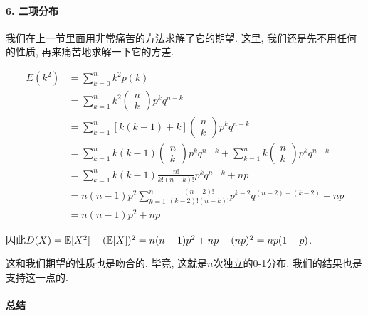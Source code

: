 \paragraph{6. 二项分布} 
我们在上一节里面用非常痛苦的方法求解了它的期望. 这里, 我们还是先不用任何的性质, 再来痛苦地求解一下它的方差. 

$$\begin{aligned} E\left(k^2\right) & =\sum_{k=0}^n k^2 p(k) \\ & =\sum_{k=1}^n k^2\left(\begin{array}{l}n \\ k\end{array}\right) p^k q^{n-k} \\ & =\sum_{k=1}^n[{k}({k}-1)+{k}]\left(\begin{array}{l}n \\ k\end{array}\right) p^k q^{n-k} \\ & =\sum_{k=1}^n k(k-1)\left(\begin{array}{l}n \\ k\end{array}\right) p^k q^{n-k}+\sum_{k=1}^n k\left(\begin{array}{l}n \\ k\end{array}\right) p^k q^{n-k} \\ & =\sum_{k=1}^n k(k-1) \frac{n !}{k !(n-k) !} p^k q^{n-k}+n p \\ & =n(n-1) p^2 \sum_{k=1}^n \frac{(n-2) !}{(k-2) !(n-k) !} p^{k-2} q^{(n-2)-(k-2)}+n p \\ & =n(n-1) p^2+n p\end{aligned}$$

因此$D (X)=\mathbb E[X^2]-(\mathbb E[X])^2=n(n-1) p^2+n p-(n p)^2=n p(1-p)$. 

这和我们期望的性质也是吻合的. 毕竟, 这就是$n$次独立的0-1分布. 我们的结果也是支持这一点的. 


\paragraph{总结}

